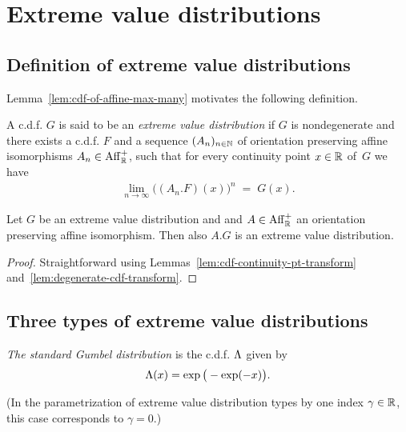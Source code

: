 \chapter{Extreme value distributions}

\section{Definition of extreme value distributions}

Lemma~\ref{lem:cdf-of-affine-max-many} motivates the following definition.

\begin{definition}
  \label{def:extr-val-distr}
  \leanok
  A c.d.f. $G$ is said to be an \emph{extreme value distribution} if
  $G$ is nondegenerate and
  there exists a c.d.f. $F$ and a sequence $(A_n)_{n \in \mathbb{N}}$ of orientation
  preserving affine isomorphisms $A_n \in \mathrm{Aff}^+_{\mathbb{R}}$, such that
  for every continuity point $x \in \mathbb{R}$ of~$G$ we have
  \begin{align*}
  \lim_{n \to \infty} \big( (A_n.F)(x) \big)^n \; = \; G(x) .
  \end{align*}
\end{definition}

\begin{lemma}
  \label{lem:extr-val-distr-transform}
  \leanok
  Let $G$ be an extreme value distribution and
  and $A \in \mathrm{Aff}^+_{\mathbb{R}}$ an orientation preserving affine isomorphism.
  Then also $A.G$ is an extreme value distribution.
\end{lemma}
\begin{proof}
  Straightforward using Lemmas~\ref{lem:cdf-continuity-pt-transform}
  and~\ref{lem:degenerate-cdf-transform}.
\end{proof}



\section{Three types of extreme value distributions}

\begin{definition}
  \label{def:std-Gumbel-cdf}
  \emph{The standard Gumbel distribution} is the c.d.f. $\Lambda$ given by
  \begin{align*}
  \Lambda (x) = \exp\big(-\exp(-x)\big) .
  \end{align*}

  (In the parametrization of extreme value distribution types by one
  index $\gamma \in \mathbb{R}$, this case corresponds to $\gamma = 0$.)
\end{definition}

